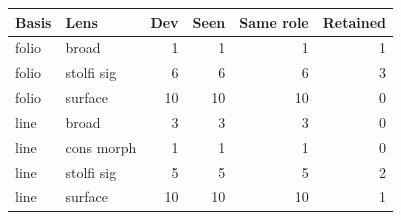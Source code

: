 {\small
\begin{tabular}{llrrrr}
\toprule
Basis & Lens & Dev & Seen & Same role & Retained \\
\midrule
folio & broad & 1 & 1 & 1 & 1 \\
folio & stolfi sig & 6 & 6 & 6 & 3 \\
folio & surface & 10 & 10 & 10 & 0 \\
line & broad & 3 & 3 & 3 & 0 \\
line & cons morph & 1 & 1 & 1 & 0 \\
line & stolfi sig & 5 & 5 & 5 & 2 \\
line & surface & 10 & 10 & 10 & 1 \\
\bottomrule
\end{tabular}
}
